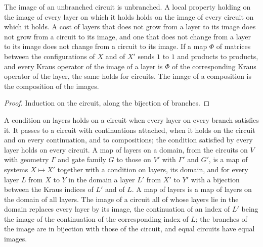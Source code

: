\begin{theorem}
    \label{thm:circuits_layer_map}
    \leanok
    The image of an unbranched circuit is unbranched. A local property holding on
    the image of every layer on which it holds holds on the image of every circuit
    on which it holds. A cost of layers that does not grow from a layer to its
    image does not grow from a circuit to its image, and one that does not change from a
    layer to its image does not change from a circuit to its image. If a map $\Phi$ of matrices between the
    configurations of $X$ and of $X'$ sends $1$ to $1$ and products to products, and
    every Kraus operator of the image of a layer is $\Phi$ of the corresponding Kraus
    operator of the layer, the same holds for circuits. The image of a composition is
    the composition of the images.
\end{theorem}
\begin{proof}\leanok
    Induction on the circuit, along the bijection of branches.
\end{proof}

\begin{definition}
    \label{def:circuits_map_layers_on}
    \leanok
    A condition on layers holds on a circuit when every layer on every branch satisfies it.
    It passes to a circuit with continuations attached, when it holds on the circuit and on
    every continuation, and to compositions; the condition satisfied by every layer holds on
    every circuit. A map of layers on a domain, from the circuits on $V$ with geometry
    $\Gamma$ and gate family $G$ to those on $V'$ with $\Gamma'$ and $G'$, is a map of
    systems $X\mapsto X'$ together with a condition on layers, its domain, and for every
    layer $L$ from $X$ to $Y$ in the domain a layer $L'$ from $X'$ to $Y'$ with a bijection
    between the Kraus indices of $L'$ and of $L$. A map of layers is a map of layers on the
    domain of all layers. The image of a circuit all of whose layers lie in the domain
    replaces every layer by its image, the continuation of an index of $L'$ being the image
    of the continuation of the corresponding index of $L$; the branches of the image are in
    bijection with those of the circuit, and equal circuits have equal images.
\end{definition}

